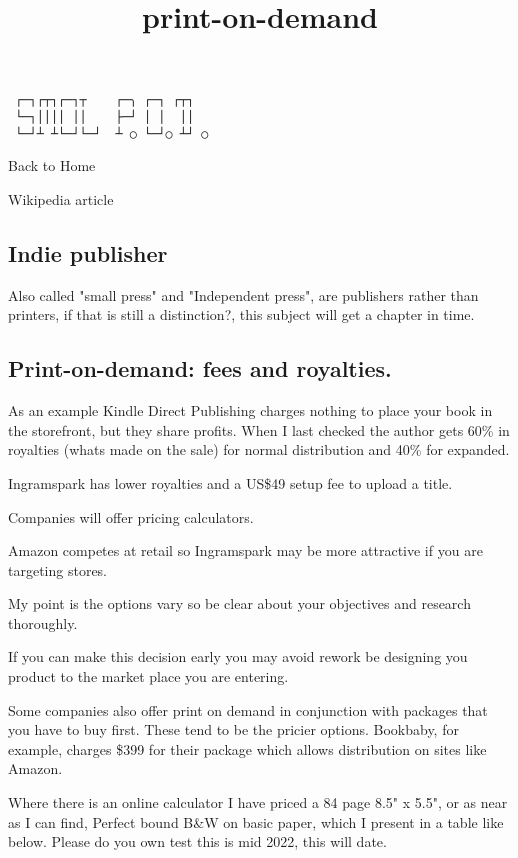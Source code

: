 \documentclass[
]{article}
\title{print-on-demand}
\author{}
\date{}
\begin{document}
\maketitle

\begin{verbatim}
 ┌─┐┌┬┐┌─┐┬    ┌─╮ ┌─┐ ┌┬┐
 └─┐││││ ││    ├─┘ │ │  ││
 └─┘┴ ┴└─┘└─┘  ┴ ○ └─┘○ ┴┘ ○
\end{verbatim}

Back to Home

Wikipedia article

\subsection{Indie publisher}

Also called "small press" and "Independent press", are publishers rather
than printers, if that is still a distinction?, this subject will get a
chapter in time.

\subsection{Print-on-demand: fees and royalties.}

As an example Kindle Direct Publishing charges nothing to place your
book in the storefront, but they share profits. When I last checked the
author gets 60\% in royalties (whats made on the sale) for normal
distribution and 40\% for expanded.

Ingramspark has lower royalties and a US\$49 setup fee to upload a
title.

Companies will offer pricing calculators.

Amazon competes at retail so Ingramspark may be more attractive if you
are targeting stores.

My point is the options vary so be clear about your objectives and
research thoroughly.

If you can make this decision early you may avoid rework be designing
you product to the market place you are entering.

Some companies also offer print on demand in conjunction with packages
that you have to buy first. These tend to be the pricier options.
Bookbaby, for example, charges \$399 for their package which allows
distribution on sites like Amazon.

Where there is an online calculator I have priced a 84 page 8.5" x 5.5",
or as near as I can find, Perfect bound B\&W on basic paper, which I
present in a table like below. Please do you own test this is mid 2022,
this will date.
\end{document}
